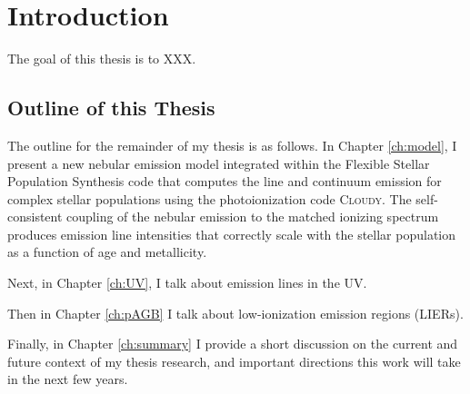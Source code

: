 \chapter{Introduction}
\label{ch:intro}



The goal of this thesis is to XXX.



\section{Outline of this Thesis}
The outline for the remainder of my thesis is as follows. In Chapter \ref{ch:model}, I present a new nebular emission model integrated within the Flexible Stellar Population Synthesis code that computes the line and continuum emission for complex stellar populations using the photoionization code \textsc{Cloudy}. The self-consistent coupling of the nebular emission to the matched ionizing spectrum produces emission line intensities that correctly scale with the stellar population as a function of age and metallicity.

Next, in Chapter \ref{ch:UV}, I talk about emission lines in the UV.

Then in Chapter \ref{ch:pAGB} I talk about low-ionization emission regions (LIERs).

Finally, in Chapter \ref{ch:summary} I provide a short discussion on the current and future context of my thesis research, and important directions this work will take in the next few years.
